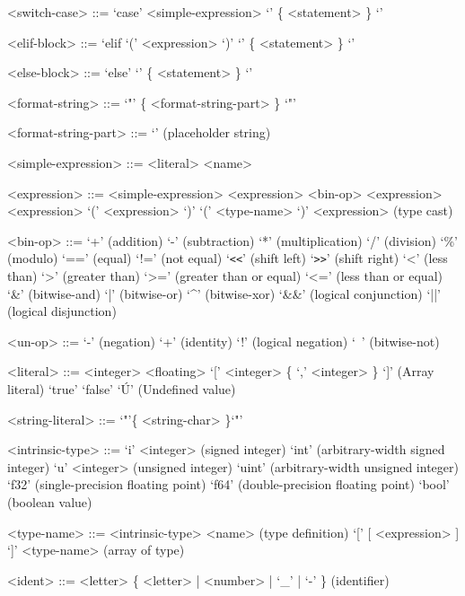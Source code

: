 \documentclass{article}
\begin{document}
\begin{grammar}
  <switch-case> ::= `case' <simple-expression> `{' \{ <statement> \} `}'

  <elif-block> ::= `elif `(' <expression> `)' `{' \{ <statement> \} `}'

  <else-block> ::= `else' `{' \{ <statement> \} `}'

  <format-string> ::= `"' \{ <format-string-part> \} `"'
  
  <format-string-part> ::= `{}' (placeholder string)

  <simple-expression> ::= <literal>
  \alt <name> 

  <expression> ::= <simple-expression>
  \alt <expression> <bin-op> <expression>
   <expression>
  \alt `(' <expression> `)'
  \alt `(' <type-name> `)' <expression> (type cast)

  <bin-op> ::= `+' (addition)
  \alt `-' (subtraction)
  \alt `*' (multiplication)
  \alt `/' (division)
  \alt `\%' (modulo)
  \alt `==' (equal)
  \alt `!=' (not equal)
  \alt `\verb!<<!' (shift left)
  \alt `\verb!>>!' (shift right)
  \alt `<' (less than)
  \alt `>' (greater than)
  \alt `>=' (greater than or equal)
  \alt `<=' (less than or equal)
  \alt `\&' (bitwise-and)
  \alt `|' (bitwise-or)
  \alt `^' (bitwise-xor)
  \alt `\&\&' (logical conjunction)
  \alt `||' (logical disjunction)

  <un-op> ::= `-' (negation)
  \alt `+' (identity)
  \alt `!' (logical negation)
  \alt `~' (bitwise-not)

  <literal> ::= <integer>
  \alt <floating>
  \alt `[' <integer> \{ `,' <integer> \} `]' (Array literal)  
  \alt `true'
  \alt `false'
  \alt `\'U' (Undefined value)

  <string-literal> ::= `"'\{ <string-char> \}`"'

  <intrinsic-type> ::= `i' <integer> (signed integer)
  \alt `int' (arbitrary-width signed integer)
  \alt `u' <integer> (unsigned integer)
  \alt `uint' (arbitrary-width unsigned integer)
  \alt `f32' (single-precision floating point)
  \alt `f64' (double-precision floating point)
  \alt `bool' (boolean value)
  
  <type-name> ::= <intrinsic-type>
  \alt <name> (type definition)
  \alt `[' [ <expression> ] `]' <type-name> (array of type)

  <ident> ::= <letter> \{ <letter> | <number> | `_' | `-' \} (identifier)


\end{grammar}
\end{document}
